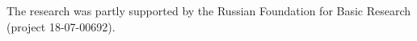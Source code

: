 




  \Ack
\noindent
The research was partly supported by the Russian 
Foundation for Basic Research (project 18-07-00692).


\vspace*{4pt}

  \begin{multicols}{2}

\renewcommand{\bibname}{\protect\rmfamily References}

{\small\frenchspacing
 { %
 \begin{thebibliography}{99}
 
 \vspace*{-4pt}
 

\end{thebibliography}}}
\end{multicols}
